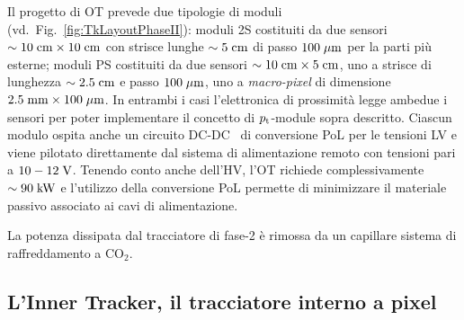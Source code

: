 Il progetto di OT prevede due tipologie di moduli (vd.~Fig.~\ref{fig:TkLayoutPhaseII}): moduli 2S costituiti da due sensori $\sim10\rm \; cm\times10\rm \; cm$ con strisce lunghe $\sim5\rm \; cm$ di passo $100\; \mu \rm m$ per la parti pi\`u esterne; moduli PS costituiti da due sensori $\sim10\rm \; cm\times5\rm \; cm$, uno a strisce di lunghezza $\sim2.5\rm \; cm$ e passo $100\; \mu \rm m$, uno a {\em macro-pixel} di dimensione $2.5\rm \; mm\times100\; \mu \rm m$. In entrambi i casi l'elettronica di prossimit\`a legge ambedue i sensori per poter implementare il concetto di ${p_{\rm t}}$-module sopra descritto. Ciascun modulo ospita anche un circuito DC-DC~\cite{DCDCfase2} di conversione PoL per le tensioni LV e viene pilotato direttamente dal sistema di alimentazione remoto con tensioni pari a $10-12\rm \; V$. Tenendo conto anche dell'HV, l'OT richiede complessivamente $\sim90\rm \; kW$ e l'utilizzo della conversione PoL permette di minimizzare il materiale passivo associato ai cavi di alimentazione.

La potenza dissipata dal tracciatore di fase-2 \`e rimossa da un capillare sistema di raffreddamento a CO$_2$.



%
%


\subsection{L'Inner Tracker, il tracciatore interno a pixel}

